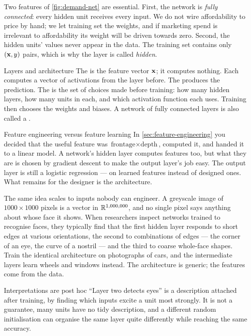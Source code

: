 Two features of \cref{fig:demand-net} are essential. First, the network is
\emph{fully connected}: every hidden unit receives every input. We do not wire
affordability to price by hand; we let training set the weights, and if
marketing spend is irrelevant to affordability its weight will be driven
towards zero. Second, the hidden units' values never appear in the data. The
training set contains only $(\mathbf{x}, y)$ pairs, which is why the layer is called
\emph{hidden}.

\begin{defbox}{Layers and architecture}
The  is the feature vector $\mathbf{x}$; it computes nothing. Each
 computes a vector of activations from the layer before.
The  produces the prediction. The  is the
set of choices made before training: how many hidden layers, how many units in
each, and which activation function each uses. Training then chooses the weights
and biases. A network of fully connected layers is also called a
.
\end{defbox}

\begin{keyinsight}{Feature engineering versus feature learning}
In \cref{sec:feature-engineering} you decided that the useful feature was
$\text{frontage}\times\text{depth}$, computed it, and handed it to a linear
model. A network's hidden layer computes features too, but what they are is
chosen by gradient descent to make the output layer's job easy. The output layer
is still a logistic regression --- on learned features instead of designed
ones. What remains for the designer is the architecture.
\end{keyinsight}

The same idea scales to inputs nobody can engineer. A greyscale image of
$1000\times1000$ pixels is a vector in $\mathbb{R}^{1{,}000{,}000}$, and no single pixel
says anything about whose face it shows. When researchers inspect networks
trained to recognise faces, they typically find that the first hidden layer
responds to short edges at various orientations, the second to combinations of
edges --- the corner of an eye, the curve of a nostril --- and the third to
coarse whole-face shapes. Train the identical architecture on photographs of
cars, and the intermediate layers learn wheels and windows instead. The
architecture is generic; the features come from the data.

\begin{pitfall}{Interpretations are post hoc}
``Layer two detects eyes'' is a description attached after training, by finding
which inputs excite a unit most strongly. It is not a guarantee, many units have
no tidy description, and a different random initialisation can organise the
same layer quite differently while reaching the same accuracy.
\end{pitfall}

